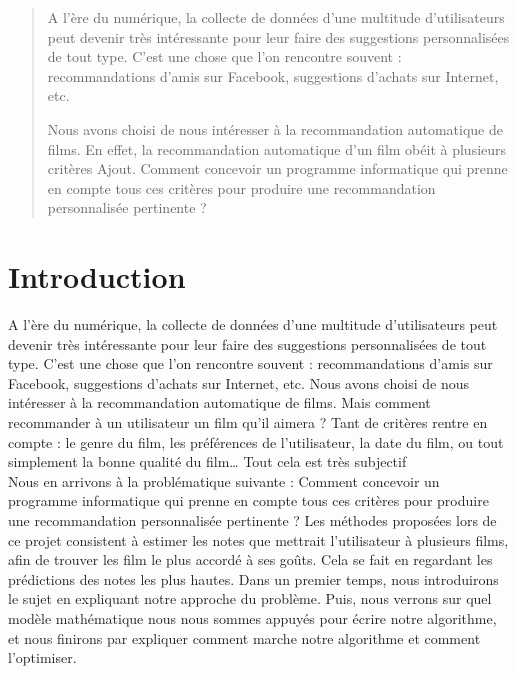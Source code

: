 \documentclass[a4paper,10pt]{article}
\title{}
\author{}
\begin{document}
\maketitle

\begin{abstract}
A l’ère du numérique, la collecte de données d’une multitude d’utilisateurs peut devenir très intéressante pour leur faire des suggestions personnalisées de tout type. C’est une chose que l'on rencontre souvent : recommandations d’amis sur Facebook, suggestions d’achats sur Internet, etc.

Nous avons choisi de nous intéresser à la recommandation automatique de films. En effet, la recommandation automatique d’un film obéit à plusieurs critères Ajout. Comment concevoir un programme informatique qui prenne en compte tous ces critères pour produire une recommandation personnalisée pertinente ?

\end{abstract}

\section*{Introduction}
A l’ère du numérique, la collecte de données d’une multitude d’utilisateurs peut devenir très intéressante pour leur faire des suggestions 
personnalisées de tout type. C’est une chose que l’on rencontre souvent : recommandations d’amis sur Facebook, suggestions d’achats sur Internet, etc.
Nous avons choisi de nous intéresser à la recommandation automatique de films.
Mais comment recommander à un utilisateur un film qu’il aimera ? Tant de critères rentre en compte : 
le genre du film, les préférences de l’utilisateur, la date du film, ou tout simplement la bonne qualité du film… Tout cela est très subjectif \! \\


Nous en arrivons à la problématique suivante : Comment concevoir un programme informatique 
qui prenne en compte tous ces critères pour produire une recommandation personnalisée pertinente ?
Les méthodes proposées lors de ce projet consistent à estimer les notes que mettrait l’utilisateur à plusieurs films,
afin de trouver les film le plus accordé à ses goûts. Cela se fait en regardant les prédictions des notes les plus hautes. 
Dans un premier temps, nous introduirons le sujet en expliquant notre approche du problème.
Puis, nous verrons sur quel modèle mathématique nous nous sommes appuyés pour écrire notre algorithme, et nous finirons par expliquer comment marche notre algorithme et comment l’optimiser. \\
\end{document}
